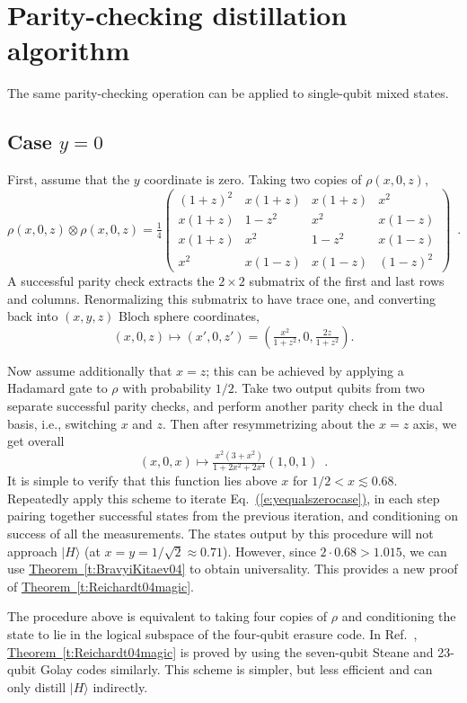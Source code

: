 \documentclass[11pt]{article}
\def\ket #1{\vert #1\rangle}
\newcommand{\beq}{\begin{equation}}
\newcommand{\eeq}{\end{equation}}
\theoremstyle{note}
\newcommand{\eqnref}[1]{\hyperref[#1]{{(\ref*{#1})}}}
\newcommand{\thmref}[1]{\hyperref[#1]{{Theorem~\ref*{#1}}}}
\begin{document}
\section{Parity-checking distillation algorithm} \label{s:fourqubitcode}

The same parity-checking operation can be applied to single-qubit mixed states.  


\subsection{Case $y=0$}

First, assume that the $y$ coordinate is zero.  Taking two copies of $\rho(x,0,z)$, 
\beq
\rho(x,0,z) \otimes \rho(x,0,z)
= \tfrac{1}{4} \left(\begin{smallmatrix}
(1+z)^2 & x(1+z) & x(1+z) & x^2\\
x(1+z)   & 1-z^2 &  x^2    & x(1-z) \\
x(1+z)   & x^2   & 1-z^2 & x(1-z) \\
x^2      & x(1-z)  & x(1-z) & (1-z)^2
\end{smallmatrix}\right)
 \enspace .
\eeq
A successful parity check extracts the $2 \times 2$ submatrix of the first and last rows and columns.  Renormalizing this submatrix to have trace one, and converting back into $(x,y,z)$ Bloch sphere coordinates,
\beq \label{e:yzero}
(x,0,z) \mapsto (x',0,z') = (\tfrac{x^2}{1+z^2},0,\tfrac{2z}{1+z^2}) .
\eeq

Now assume additionally that $x=z$; this can be achieved by applying a Hadamard gate to $\rho$ with probability $1/2$.  Take two output qubits from two separate successful parity checks, and perform another parity check in the dual basis, i.e., switching $x$ and $z$.  Then after resymmetrizing about the $x=z$ axis, we get overall
\beq \label{e:yequalszerocase}
(x,0,x) \mapsto \tfrac{x^2(3+x^2)}{1+2x^2+2x^4} (1,0,1)
 \enspace .
\eeq
It is simple to verify that this function lies above $x$ for $1/2 < x \lesssim 0.68$.  Repeatedly apply this scheme to iterate Eq.~\eqnref{e:yequalszerocase}, in each step pairing together successful states from the previous iteration, and conditioning on success of all the measurements.  The states output by this procedure will not approach $\ket H$ (at $x = y = 1/\sqrt 2 \approx 0.71$).  However, since $2 \cdot 0.68 > 1.015$, we can use \thmref{t:BravyiKitaev04} to obtain universality.  This provides a new proof of \thmref{t:Reichardt04magic}.  

The procedure above is equivalent to taking four copies of $\rho$ and conditioning the state to lie in the logical subspace of the four-qubit erasure code.  In Ref.~\cite{Reichardt04magic}, \thmref{t:Reichardt04magic} is proved by using the seven-qubit Steane and 23-qubit Golay codes similarly.  This scheme is simpler, but less efficient and can only distill $\ket H$ indirectly.  
\end{document}

